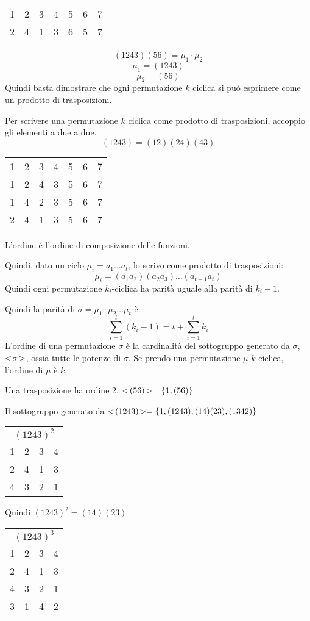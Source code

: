 \begin{tabular}{*{7}{c}}
1 & 2 & 3 & 4 & 5 & 6 & 7 \\
2 & 4 & 1 & 3 & 6 & 5 & 7
\end{tabular}
\[
(1 2 4 3) (5 6) = \mu_1 \cdot \mu_2
\]
\[
\mu_1 = (1 2 4 3)
\]
\[
\mu_2 = (5 6)
\]
Quindi basta dimostrare che ogni permutazione $k$ ciclica si pu\`o esprimere come un prodotto di trasposizioni.

Per scrivere una permutazione $k$ ciclica come prodotto di trasposizioni, accoppio gli elementi a due a due.
\[
(1 2 4 3) = (1 2) (2 4) (4 3)
\]
\begin{tabular}{*{7}{c}}
1 & 2 & 3 & 4 & 5 & 6 & 7 \\
1 & 2 & 4 & 3 & 5 & 6 & 7 \\
1 & 4 & 2 & 3 & 5 & 6 & 7 \\
2 & 4 & 1 & 3 & 5 & 6 & 7
\end{tabular}

L'ordine \`e l'ordine di composizione delle funzioni.

Quindi, dato un ciclo $\mu_i = a_1 \dots a_t$, lo scrivo come prodotto di trasposizioni:
\[
\mu_i = (a_1 a_2) (a_2 a_3) \dots (a_{t-1} a_t)
\]
Quindi ogni permutazione $k_i$-ciclica ha parit\`a uguale alla parit\`a di $k_i - 1$.

Quindi la parit\`a di $\sigma = \mu_1 \cdot \mu_2 \dots \mu_t$ \`e:
\[
\sum_{i = 1}^{t} (k_i - 1) = t + \sum_{i = 1}^{t} k_i
\]
L'ordine di una permutazione $\sigma$ \`e la cardinalit\`a del sottogruppo generato da $\sigma$, $<\!{\sigma}\!>$, ossia tutte le potenze di $\sigma$. Se prendo una permutazione $\mu$ $k$-ciclica, l'ordine di $\mu$ \`e $k$.

Una trasposizione ha ordine 2. $<\!{(5 6)}\!> = \{ 1, (5 6) \}$

Il sottogruppo generato da $<\!{(1 2 4 3)}\!> = \{ 1, (1 2 4 3), (1 4) (2 3), (1 3 4 2) \}$

\begin{tabular}{*{4}{c}}
\multicolumn{4}{c}{$(1 2 4 3)^2$} \\
1 & 2 & 3 & 4 \\
2 & 4 & 1 & 3 \\
4 & 3 & 2 & 1
\end{tabular}

Quindi $(1 2 4 3)^2 = (1 4) (2 3)$

\begin{tabular}{*{4}{c}}
\multicolumn{4}{c}{$(1 2 4 3)^3$} \\
1 & 2 & 3 & 4 \\
2 & 4 & 1 & 3 \\
4 & 3 & 2 & 1 \\
3 & 1 & 4 & 2
\end{tabular}

